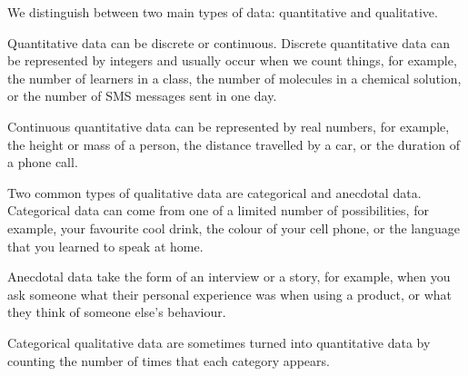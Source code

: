 We distinguish between two main types of data: quantitative and
qualitative.


Quantitative data can be discrete or continuous. Discrete quantitative
data can be represented by integers and usually occur when we count
things, for example, the number of learners in a class, the number of
molecules in a chemical solution, or the number of SMS messages sent
in one day.

Continuous quantitative data can be represented by real numbers, for
example, the height or mass of a person, the distance travelled by a
car, or the duration of a phone call.


Two common types of qualitative data are categorical and anecdotal
data. Categorical data can come from one of a limited number of
possibilities, for example, your favourite cool drink, the colour of
your cell phone, or the language that you learned to speak at home.

Anecdotal data take the form of an interview or a story, for example,
when you ask someone what their personal experience was when using a
product, or what they think of someone else's behaviour.

Categorical qualitative data are sometimes turned into quantitative
data by counting the number of times that each category appears.


